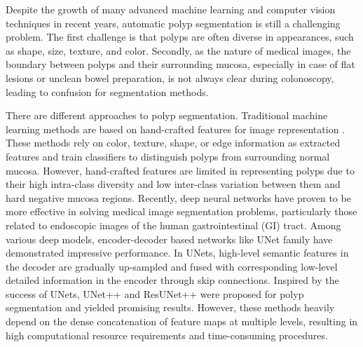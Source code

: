 \documentclass[review, sort&compress]{elsarticle}
\begin{document}
Despite the growth of many advanced machine learning and computer vision techniques in recent years, automatic polyp segmentation is still a challenging problem. The first challenge is that polyps are often diverse in appearances, such as shape, size, texture, and color. Secondly, as the nature of medical images, the boundary between polyps and their surrounding mucosa, especially in case of flat lesions or unclean bowel preparation, is not always clear during colonoscopy, leading to confusion for segmentation methods.

There are different approaches to polyp segmentation. Traditional machine learning methods are based on hand-crafted features for image representation  \cite{iwahori2013automatic, silva2014toward}. These methods rely on color, texture, shape, or edge information as extracted features and train classifiers to distinguish polyps from surrounding normal mucosa. However, hand-crafted features are limited in representing polyps due to their high intra-class diversity and low inter-class variation between them and hard negative mucosa regions. Recently, deep neural networks have proven to be more effective in solving medical image segmentation problems, particularly those related to endoscopic images of the human gastrointestinal (GI) tract. Among various deep models, encoder-decoder based networks like UNet family \cite{ronneberger2015u} have demonstrated impressive performance. In UNets, high-level semantic features in the decoder are gradually up-sampled and fused with corresponding low-level detailed information in the encoder through skip connections. Inspired by the success of UNets, UNet++ \cite{zhou2019unet++} and ResUNet++ \cite{jha2019resunet++} were proposed for polyp segmentation and yielded promising results. However, these methods heavily depend on the dense concatenation of feature maps at multiple levels, resulting in high computational resource requirements and time-consuming procedures. 
\end{document}
